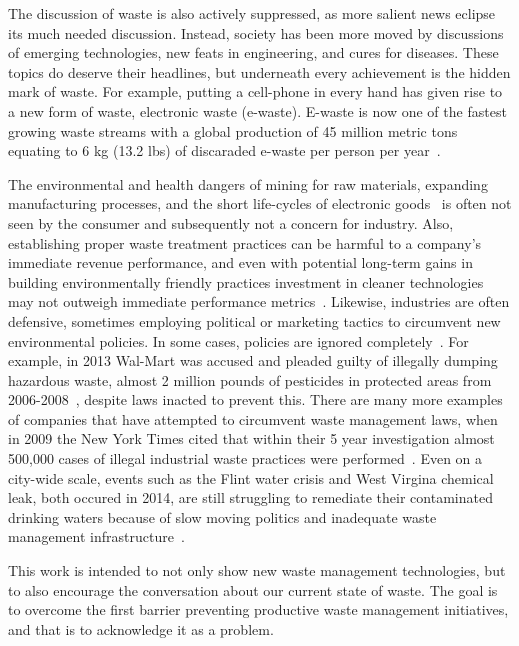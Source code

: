 \documentclass[../main/main]{subfiles}
\begin{document}
The discussion of waste is also actively suppressed, as more salient news eclipse its much needed discussion. Instead, society has been more moved by discussions of emerging technologies, new feats in engineering, and cures for diseases. These topics do deserve their headlines, but underneath every achievement is the hidden mark of waste. For example, putting a cell-phone in every hand has given rise to a new form of waste, electronic waste (e-waste). E-waste is now one of the fastest growing waste streams with a global production of 45 million metric tons equating to 6 kg (13.2 lbs) of discaraded e-waste per person per year~\cite{balde2017}.

The environmental and health dangers of mining for raw materials, expanding manufacturing processes, and the short life-cycles of electronic goods~\cite{hong2015} is often not seen by the consumer and subsequently not a concern for industry. Also, establishing proper waste treatment practices can be harmful to a company's immediate revenue performance, and even with potential long-term gains in building environmentally friendly practices investment in cleaner technologies may not outweigh immediate performance metrics~\cite{king2001}. Likewise, industries are often defensive, sometimes employing political or marketing tactics to circumvent new environmental policies. In some cases, policies are ignored completely~\cite{nemerow1998,markowitz2013}. For example, in 2013 Wal-Mart was accused and pleaded guilty of illegally dumping hazardous waste, almost 2 million pounds of pesticides in protected areas from 2006-2008~\cite{usatoday2013}, despite laws inacted to prevent this. There are many more examples of companies that have attempted to circumvent waste management laws, when in 2009 the New York Times cited that within their 5 year investigation almost 500,000 cases of illegal industrial waste practices were performed~\cite{duhigg2009}.
Even on a city-wide scale, events such as the Flint water crisis and West Virgina chemical leak, both occured in 2014, are still struggling to remediate their contaminated drinking waters because of slow moving politics and inadequate waste management infrastructure~\cite{haimerl2017,kristabryson2016}.

This work is intended to not only show new waste management technologies, but to also encourage the conversation about our current state of waste. The goal is to overcome the first barrier preventing productive waste management initiatives, and that is to acknowledge it as a problem.
\end{document}
